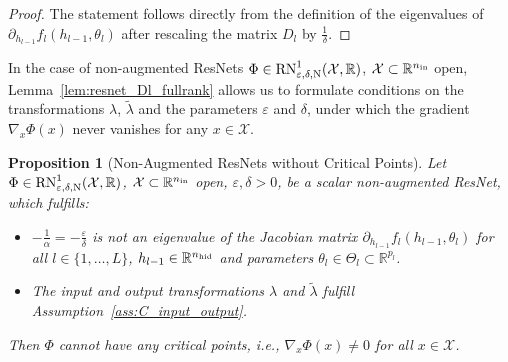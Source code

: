 \documentclass[10pt]{article}
\newtheorem{proposition}[theorem]{Proposition}
\theoremstyle{definition}
\numberwithin{equation}{section}
\newcommand{\eps}{\varepsilon}
\newcommand{\R}{\mathbb{R}}
\newcommand*{\nhid}{n_\textup{hid}}
\newcommand*{\nin}{n_\textup{in}}
\begin{document}
\begin{proof}
    The statement follows directly from the definition of the eigenvalues of  $\partial_{h_{l-1}}f_l(h_{l-1},\theta_l)$ after rescaling the matrix $D_l$ by $\frac{1}{\delta}$.
\end{proof}

In the case of non-augmented ResNets $\Phi \in \textup{RN}^1_{\eps,\delta,\textup{N}}(\mathcal{X},\R)$, $\mathcal{X}\subset \R^{\nin}$ open, Lemma~\ref{lem:resnet_Dl_fullrank} allows us to formulate  conditions on the transformations $\lambda$, $\tilde{\lambda}$ and the parameters $\eps$ and $\delta$, under which the gradient $\nabla_x\Phi(x)$ never vanishes for any $x \in \mathcal{X}$. 

\begin{proposition}[Non-Augmented ResNets without Critical Points]\label{prop:resnet_nonaugmented}
	Let $\Phi \in \textup{RN}^1_{\eps,\delta,\textup{N}}(\mathcal{X},\R)$, $\mathcal{X}\subset \R^{\nin}$ open, $\eps,\delta>0$, be a scalar non-augmented ResNet, which fulfills:
	\begin{itemize}
		\item $ -\frac{1}{\alpha} = -\frac{\eps}{\delta}$ is not an eigenvalue of the Jacobian matrix $\partial_{h_{l-1}}f_l(h_{l-1},\theta_l)$ for all $l \in \{1,\ldots,L\}$, $h_{l-1} \in \R^{\nhid}$ and parameters $\theta_l \in \Theta_l \subset \R^{p_l}$.
		\item The input and output transformations $\lambda$ and $\tilde{\lambda}$ fulfill Assumption~\ref{ass:C_input_output}.
	\end{itemize}
	Then $\Phi$ cannot have any critical points, i.e., $\nabla_x \Phi(x) \neq 0$ for all $x \in \mathcal{X}$.
\end{proposition}
\end{document}
